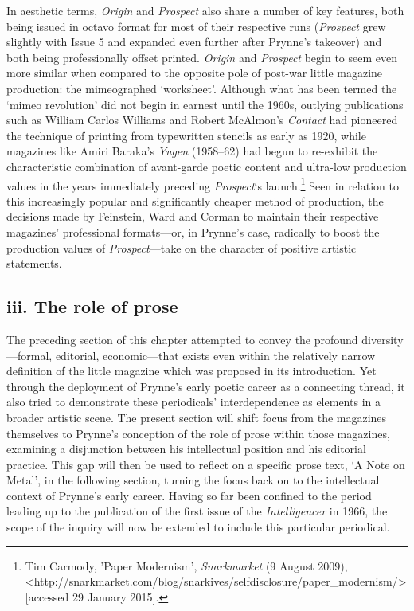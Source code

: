 \documentclass[]{article}
\begin{document}
In aesthetic terms, \emph{Origin} and \emph{Prospect} also share a
number of key features, both being issued in octavo format for most of
their respective runs (\emph{Prospect} grew slightly with Issue 5 and
expanded even further after Prynne’s takeover) and both being
professionally offset printed. \emph{Origin} and \emph{Prospect} begin
to seem even more similar when compared to the opposite pole of post-war
little magazine production: the mimeographed ‘worksheet’. Although what
has been termed the ‘mimeo revolution’ did not begin in earnest until
the 1960s, outlying publications such as William Carlos Williams and
Robert McAlmon’s \emph{Contact} had pioneered the technique of printing
from typewritten stencils as early as 1920, while magazines like Amiri
Baraka’s \emph{Yugen} (1958–62) had begun to re-exhibit the
characteristic combination of avant-garde poetic content and ultra-low
production values in the years immediately preceding \emph{Prospect}‘s
launch.\footnote{Tim Carmody, ’Paper Modernism’, \emph{Snarkmarket} (9
  August 2009),
  \textless{}http://snarkmarket.com\slash blog\slash snarkives\slash selfdisclosure\slash paper\_modernism/\textgreater{}
  {[}accessed 29 January 2015{]}.} Seen in relation to this increasingly
popular and significantly cheaper method of production, the decisions
made by Feinstein, Ward and Corman to maintain their respective
magazines’ professional formats—or, in Prynne’s case, radically to boost
the production values of \emph{Prospect}—take on the character of
positive artistic statements.

\subsection{iii. The role of prose}\label{iii.-the-role-of-prose}

The preceding section of this chapter attempted to convey the profound
diversity—formal, editorial, economic—that exists even within the
relatively narrow definition of the little magazine which was proposed
in its introduction. Yet through the deployment of Prynne’s early poetic
career as a connecting thread, it also tried to demonstrate these
periodicals’ interdependence as elements in a broader artistic scene.
The present section will shift focus from the magazines themselves to
Prynne’s conception of the role of prose within those magazines,
examining a disjunction between his intellectual position and his
editorial practice. This gap will then be used to reflect on a specific
prose text, ‘A Note on Metal’, in the following section, turning the
focus back on to the intellectual context of Prynne’s early career.
Having so far been confined to the period leading up to the publication
of the first issue of the \emph{Intelligencer} in 1966, the scope of the
inquiry will now be extended to include this particular periodical.
\end{document}
